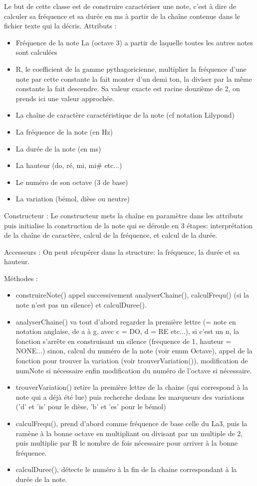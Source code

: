 \documentclass{EPUProjetPeiP}
\begin{document}
Le but de cette classe est de construire caractériser une note, c'est à dire de calculer sa fréquence et sa durée en ms à partir de la chaîne contenue dans le fichier texte qui la décris.
Attributs :
\begin{itemize}
\item Fréquence de la note La (octave 3) a partir de laquelle toutes les autres notes sont calculées
\item R, le coefficient de la gamme pythagoricienne, multiplier la fréquence d'une note par cette constante la fait monter d'un demi ton, la diviser par la même constante la fait descendre. Sa valeur exacte est racine douzième de 2, on prends ici une valeur approchée.
\item La chaîne de caractère caractéristique de la note (cf notation Lilypond)
\item La fréquence de la note (en Hz)
\item La durée de la note (en ms)
\item La hauteur (do, ré, mi, mi\# etc...)
\item Le numéro de son octave (3 de base)
\item La variation (bémol, dièse ou neutre)
\end{itemize}

Constructeur :
Le constructeur mets la chaîne en paramètre dans les attributs puis initialise la construction de la note qui se déroule en 3 étapes: interprétation de la chaîne de caractère, calcul de la fréquence, et calcul de la durée.

Accesseurs :
On peut récupérer dans la structure: la fréquence, la durée et sa hauteur.

Méthodes :
\begin{itemize}
\item construireNote() appel successivement analyserChaine(), calculFrequ() (si la note n'est pas un silence) et calculDuree().
\item analyserChaine() va tout d'abord regarder la première lettre (= note en notation anglaise, de a à g, avec c = DO, d = RE etc...), si c'est un n, la fonction s'arrête en construisant un silence (frequence de 1, hauteur = NONE...) sinon, calcul du numéro de la note (voir enum Octave), appel de la fonction pour trouver la variation (voir trouverVariation()), modification de numNote si nécessaire enfin modification du numéro de l'octave si nécessaire.
\item trouverVariation() retire la première lettre de la chaine (qui correspond à la note qui a déjà été lue) puis recherche dedans les marqueurs des variations ('d' et 'is' pour le dièse, 'b' et 'es' pour le bémol)
\item calculFrequ(), prend d'abord comme fréquence de base celle du La3, puis la ramène à la bonne octave en multipliant ou divisant par un multiple de 2, puis multiplie par R le nombre de fois nécessaire pour arriver à la bonne fréquence.
\item calculDuree(), détecte le numéro à la fin de la chaine correspondant à la durée de la note.
\end{itemize}
\end{document}

